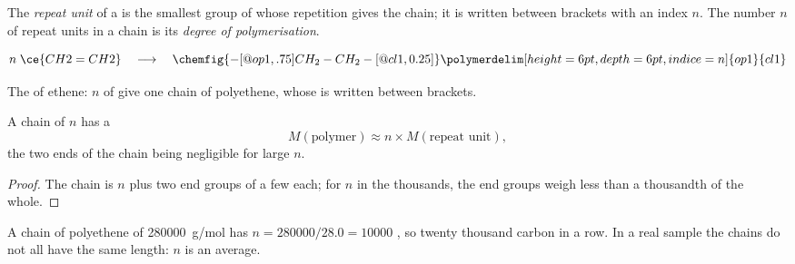 \begin{definition}\label{def:g12:polymers:repeat-unit}
The \emph{repeat unit} of a  is the smallest
group of  whose repetition gives the chain; it is written between
brackets with an index $n$. The number $n$ of repeat units in a chain is
its \emph{degree of polymerisation}.
\end{definition}

\begin{omfigure}
\[
  n\;\ce{CH2=CH2}
  \quad\longrightarrow\quad
  \chemfig{-[@{op1,.75}]CH_2-CH_2-[@{cl1,0.25}]}
  \polymerdelim[height=6pt, depth=6pt, indice=n]{op1}{cl1}
\]

{\small The  of ethene: $n$  of  give one
chain of polyethene, whose   is written between
brackets.}
\end{omfigure}

\begin{proposition}\label{prop:g12:polymers:molar-mass}
A chain of  $n$ has a 
\[
  M(\text{polymer}) \approx n \times M(\text{repeat unit}) ,
\]
the two ends of the chain being negligible for large $n$.
\end{proposition}

\begin{proof}
The chain is $n$  plus two end groups of a few  each;
for $n$ in the thousands, the end groups weigh less than a thousandth of
the whole.
\end{proof}

\begin{example}\label{ex:g12:polymers:pe}
A chain of polyethene of  \qty{280000}{g/mol} has
$n = 280000/28.0 = 10000$ , so twenty thousand carbon 
in a row. In a real sample the chains do not all have the same length:
$n$ is an average.
\end{example}

